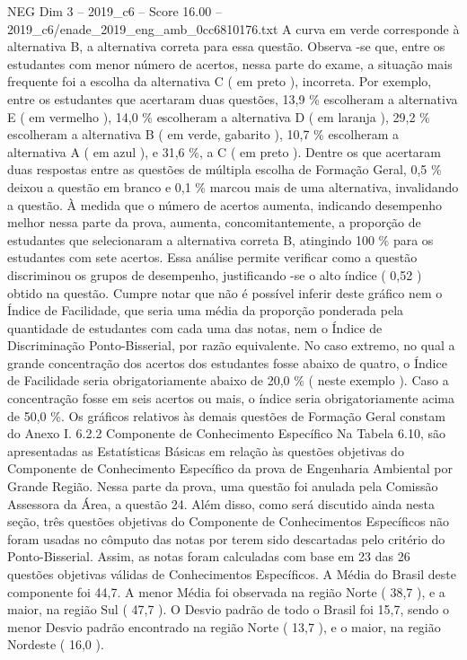 \begin{textsample}{NEG Dim 3 – 2019\_c6 – Score 16.00 – 2019\_c6/enade\_2019\_eng\_amb\_0cc6810176.txt}
A curva em verde corresponde à alternativa B, a alternativa correta para essa questão.
Observa -se que, entre os estudantes com menor número de acertos, nessa parte do exame, a situação mais frequente foi a escolha da alternativa C ( em preto ), incorreta.
Por exemplo, entre os estudantes que acertaram duas questões, 13,9 \% escolheram a alternativa E ( em vermelho ), 14,0 \% escolheram a alternativa D ( em laranja ), 29,2 \% escolheram a alternativa B ( em verde, gabarito ), 10,7 \% escolheram a alternativa A ( em azul ), e 31,6 \%, a C ( em preto ).
Dentre os que acertaram duas respostas entre as questões de múltipla escolha de Formação Geral, 0,5 \% deixou a questão em branco e 0,1 \% marcou mais de uma alternativa, invalidando a questão.
À medida que o número de acertos aumenta, indicando desempenho melhor nessa parte da prova, aumenta, concomitantemente, a proporção de estudantes que selecionaram a alternativa correta B, atingindo 100 \% para os estudantes com sete acertos.
Essa análise permite verificar como a questão discriminou os grupos de desempenho, justificando -se o alto índice ( 0,52 ) obtido na questão.
Cumpre notar que não é possível inferir deste gráfico nem o Índice de Facilidade, que seria uma média da proporção ponderada pela quantidade de estudantes com cada uma das notas, nem o Índice de Discriminação Ponto-Bisserial, por razão equivalente.
No caso extremo, no qual a grande concentração dos acertos dos estudantes fosse abaixo de quatro, o Índice de Facilidade seria obrigatoriamente abaixo de 20,0 \% ( neste exemplo ).
Caso a concentração fosse em seis acertos ou mais, o índice seria obrigatoriamente acima de 50,0 \%.
Os gráficos relativos às demais questões de Formação Geral constam do Anexo I. 6.2.2 Componente de Conhecimento Específico Na Tabela 6.10, são apresentadas as Estatísticas Básicas em relação às questões objetivas do Componente de Conhecimento Específico da prova de Engenharia Ambiental por Grande Região.
Nessa parte da prova, uma questão foi anulada pela Comissão Assessora da Área, a questão 24.
Além disso, como será discutido ainda nesta seção, três questões objetivas do Componente de Conhecimentos Específicos não foram usadas no cômputo das notas por terem sido descartadas pelo critério do Ponto-Bisserial.
Assim, as notas foram calculadas com base em 23 das 26 questões objetivas válidas de Conhecimentos Específicos.
A Média do Brasil deste componente foi 44,7.
A menor Média foi observada na região Norte ( 38,7 ), e a maior, na região Sul ( 47,7 ).
O Desvio padrão de todo o Brasil foi 15,7, sendo o menor Desvio padrão encontrado na região Norte ( 13,7 ), e o maior, na região Nordeste ( 16,0 ).

\end{textsample}
